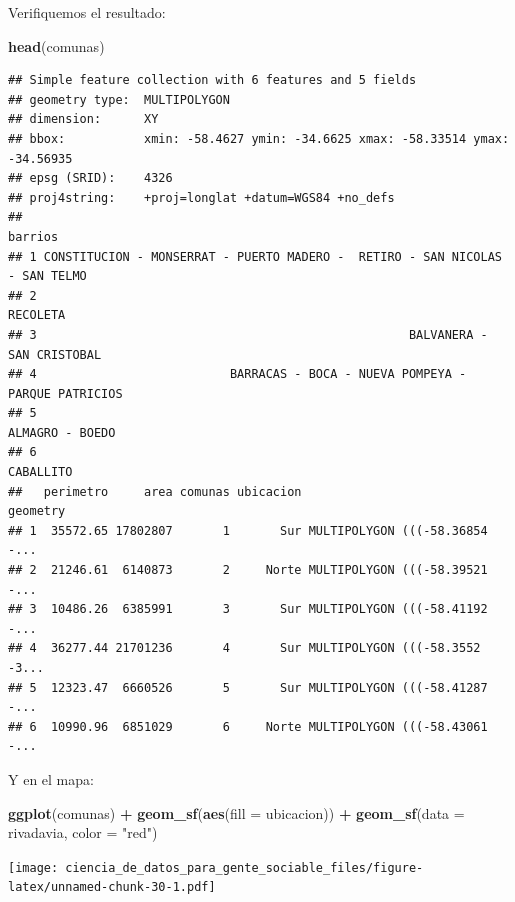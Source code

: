 \documentclass[]{book}
\newenvironment{Shaded}{\begin{snugshade}}{\end{snugshade}}
\newcommand{\KeywordTok}[1]{\textcolor[rgb]{0.13,0.29,0.53}{\textbf{#1}}}
\newcommand{\DataTypeTok}[1]{\textcolor[rgb]{0.13,0.29,0.53}{#1}}
\newcommand{\StringTok}[1]{\textcolor[rgb]{0.31,0.60,0.02}{#1}}
\newcommand{\OperatorTok}[1]{\textcolor[rgb]{0.81,0.36,0.00}{\textbf{#1}}}
\newcommand{\NormalTok}[1]{#1}
\begin{document}
Verifiquemos el resultado:

\begin{Shaded}
\begin{Highlighting}[]
\KeywordTok{head}\NormalTok{(comunas)}
\end{Highlighting}
\end{Shaded}

\begin{verbatim}
## Simple feature collection with 6 features and 5 fields
## geometry type:  MULTIPOLYGON
## dimension:      XY
## bbox:           xmin: -58.4627 ymin: -34.6625 xmax: -58.33514 ymax: -34.56935
## epsg (SRID):    4326
## proj4string:    +proj=longlat +datum=WGS84 +no_defs
##                                                                        barrios
## 1 CONSTITUCION - MONSERRAT - PUERTO MADERO -  RETIRO - SAN NICOLAS - SAN TELMO
## 2                                                                     RECOLETA
## 3                                                    BALVANERA - SAN CRISTOBAL
## 4                           BARRACAS - BOCA - NUEVA POMPEYA - PARQUE PATRICIOS
## 5                                                              ALMAGRO - BOEDO
## 6                                                                    CABALLITO
##   perimetro     area comunas ubicacion                       geometry
## 1  35572.65 17802807       1       Sur MULTIPOLYGON (((-58.36854 -...
## 2  21246.61  6140873       2     Norte MULTIPOLYGON (((-58.39521 -...
## 3  10486.26  6385991       3       Sur MULTIPOLYGON (((-58.41192 -...
## 4  36277.44 21701236       4       Sur MULTIPOLYGON (((-58.3552 -3...
## 5  12323.47  6660526       5       Sur MULTIPOLYGON (((-58.41287 -...
## 6  10990.96  6851029       6     Norte MULTIPOLYGON (((-58.43061 -...
\end{verbatim}

Y en el mapa:

\begin{Shaded}
\begin{Highlighting}[]
\KeywordTok{ggplot}\NormalTok{(comunas) }\OperatorTok{+}
\StringTok{    }\KeywordTok{geom_sf}\NormalTok{(}\KeywordTok{aes}\NormalTok{(}\DataTypeTok{fill =}\NormalTok{ ubicacion)) }\OperatorTok{+}
\StringTok{    }\KeywordTok{geom_sf}\NormalTok{(}\DataTypeTok{data =}\NormalTok{ rivadavia, }\DataTypeTok{color =} \StringTok{"red"}\NormalTok{)}
\end{Highlighting}
\end{Shaded}

\texttt{[image: ciencia\_de\_datos\_para\_gente\_sociable\_files/figure-latex/unnamed-chunk-30-1.pdf]}
\end{document}
